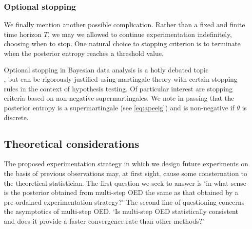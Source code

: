 \subsubsection{Optional stopping}

We finally mention another possible complication. Rather than a fixed and finite time horizon $T$, we may we allowed to continue experimentation indefinitely, choosing when to stop. One natural choice to stopping criterion is to terminate when the posterior entropy reaches a threshold value.

Optional stopping in Bayesian data analysis is a hotly debated topic \\ \cite{rouder2014, de2017}, but can be rigorously justified using martingale theory with certain stopping rules \cite{shafer2011} in the context of hypothesis testing. Of particular interest are stopping criteria based on non-negative supermartingales. We note in passing that the posterior entropy is a supermartingale (see \eqref{eq:apeeig}) and is non-negative if $\theta$ is discrete.


\subsection{Theoretical considerations}
The proposed experimentation strategy in which we design future experiments on the basis of previous observations may, at first sight, cause some consternation to the theoretical statistician. The first question we seek to answer is `in what sense is the posterior obtained from multi-step OED the same as that obtained by a pre-ordained experimentation strategy?' The second line of questioning concerns the asymptotics of multi-step OED. `Is multi-step OED statistically consistent and does it provide a faster convergence rate than other methods?'

